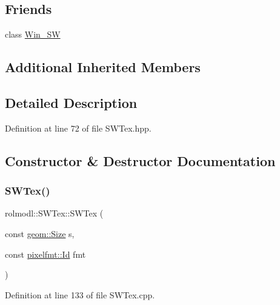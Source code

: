 \subsection*{Friends}
\begin{DoxyCompactItemize}
\item 
class \mbox{\hyperlink{classrolmodl_1_1_s_w_tex_ad21e0cba1bfeebe2505d45f8c885808a}{Win\+\_\+\+SW}}
\end{DoxyCompactItemize}
\subsection*{Additional Inherited Members}


\subsection{Detailed Description}


Definition at line 72 of file S\+W\+Tex.\+hpp.



\subsection{Constructor \& Destructor Documentation}
\mbox{\label{classrolmodl_1_1_s_w_tex_afd16b16231887a2755c911c0148ae9d3}} 
\subsubsection{\texorpdfstring{SWTex()}{SWTex()}\hspace{0.1cm}{\footnotesize\ttfamily [1/2]}}
{\footnotesize\ttfamily rolmodl\+::\+S\+W\+Tex\+::\+S\+W\+Tex (\begin{DoxyParamCaption}\item[{const \mbox{\hyperlink{structrolmodl_1_1geom_1_1_size}{geom\+::\+Size}}}]{s,  }\item[{const \mbox{\hyperlink{namespacerolmodl_1_1pixelfmt_a96282713e4465ba9211c8fd3a702b52b}{pixelfmt\+::\+Id}}}]{fmt }\end{DoxyParamCaption})}



Definition at line 133 of file S\+W\+Tex.\+cpp.

\mbox{\label{classrolmodl_1_1_s_w_tex_a1e0e27ed5ac96783de7076e351d92806}} 
